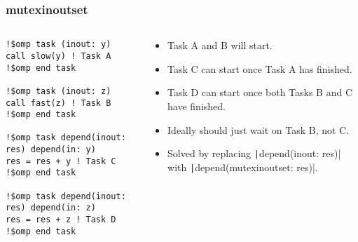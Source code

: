 \documentclass{beamer}
\begin{document}
\begin{frame}[fragile]
\frametitle{mutexinoutset}
\begin{columns}
\begin{column}{.5\textwidth}
\begin{verbatim}
!$omp task (inout: y)
call slow(y) ! Task A
!$omp end task

!$omp task (inout: z)
call fast(z) ! Task B
!$omp end task

!$omp task depend(inout: res) depend(in: y)
res = res + y ! Task C
!$omp end task

!$omp task depend(inout: res) depend(in: z)
res = res + z ! Task D
!$omp end task
\end{verbatim}
\end{column}

\begin{column}{.5\textwidth}
\begin{itemize}
  \item Task A and B will start.
  \item Task C can start once Task A has finished.
  \item Task D can start once both Tasks B and C have finished.
  \item Ideally should just wait on Task B, not C.
  \item Solved by replacing \texttt|depend(inout: res)| with \texttt|depend(mutexinoutset: res)|.
\end{itemize}
\end{column}
\end{columns}

\end{frame}

\end{document}
